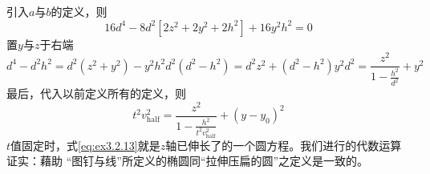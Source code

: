 引入$a$与$b$的定义，则
\begin{equation}
16d^4-8d^2[2z^2+2y^2+2h^2]+16y^2h^2=0
\label{eq:ex3.2.11}
\end{equation}
置$y$与$z$于右端
\begin{subequations}
\begin{equation}
d^4-d^2h^2=d^2(z^2+y^2)-y^2h^2
\label{eq:ex3.2.12a}
\end{equation}
\begin{equation}
d^2(d^2-h^2)=d^2z^2+(d^2-h^2)y^2
\label{eq:ex3.2.12b}
\end{equation}
\begin{equation}
d^2=\frac{z^2}{1-\frac{h^2}{d^2}}+y^2
\label{eq:ex3.2.12c}
\end{equation}
\label{eq:ex3.2.12}
\end{subequations}
最后，代入以前定义所有的定义，则
\begin{equation}
t^2v_{\text{half}}^2=\frac{z^2}{1-\frac{h^2}{t^2v_{\text{half}}^2}}+(y-y_0)^2
\label{eq:ex3.2.13}
\end{equation}
$t$值固定时，式\ref{eq:ex3.2.13}就是$z$轴已伸长了的一个圆方程。我们进行的代数运算证实：藉助
“图钉与线”所定义的椭圆同“拉伸压扁的圆”之定义是一致的。



